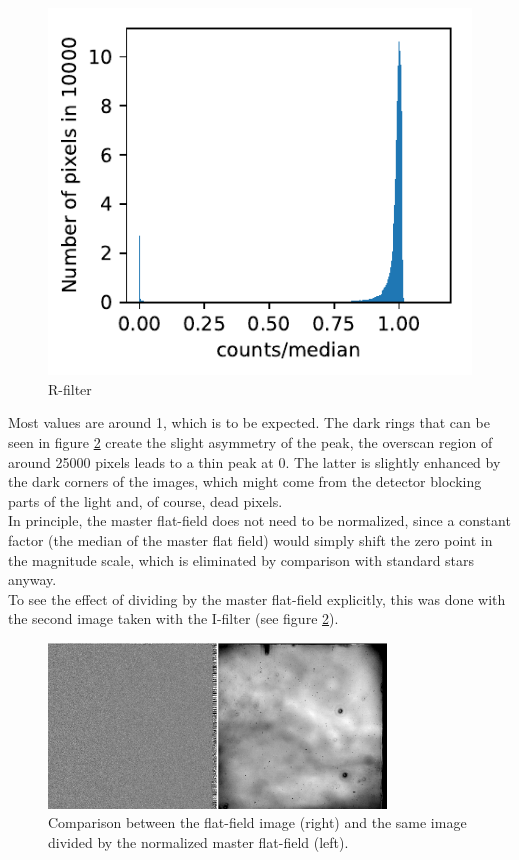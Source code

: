 \documentclass[12pt]{article}
\begin{document}
\begin{figure}[H]
\begin{minipage}[t]{0.32\textwidth}
	\label{Hist_V}
\end{minipage}
\begin{minipage}[t]{0.32\textwidth}
	\centering
	\includegraphics[width=\textwidth]{figures/Hist_R.pdf}
	\caption{R-filter}
	\label{Hist_R}
	\end{minipage}
\end{figure}
	Most values are around 1, which is to be expected. The dark rings that can be seen in figure \ref{BA} create the slight asymmetry of the peak, the overscan region of around 25000 pixels leads to a thin peak at 0. The latter is slightly enhanced by the dark corners of the images, which might come from the detector blocking parts of the light and, of course, dead pixels.\\
	In principle, the master flat-field does not need to be normalized, since a constant factor (the median of the master flat field) would simply shift the zero point in the magnitude scale, which is eliminated by comparison with standard stars anyway.\\
%
	To see the effect of dividing by the master flat-field explicitly, this was done with the second image taken with the I-filter (see figure \ref{BA}).
\begin{figure}[H]
	\centering
	\includegraphics[width=0.8\textwidth]{figures/beforeafter.png}
	\caption{Comparison between the flat-field image (right) and the same image divided by the normalized master flat-field (left).}
	\label{BA}
\end{figure}
\end{document}
